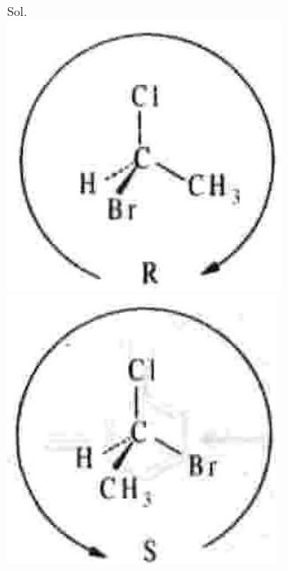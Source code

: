 \documentclass[10pt]{article}
\begin{document}
Sol.\\
\includegraphics[max width=\textwidth, center]{2025_01_28_8470952b98110cec3aabg-125(3)}\\
\includegraphics[max width=\textwidth, center]{2025_01_28_8470952b98110cec3aabg-125(1)}
\end{document}
